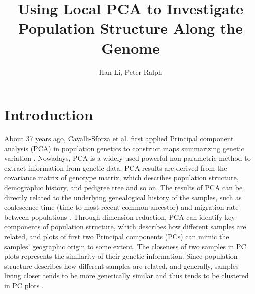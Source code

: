 \documentclass[11pt, oneside]{article}   	%
\title{Using Local PCA to Investigate Population Structure Along the Genome}
\author{Han Li, Peter Ralph}
\begin{document}
\maketitle
\doublespacing
\section{Introduction}

About 37 years ago, Cavalli-Sforza et al. first applied Principal component analysis (PCA) in population genetics to construct maps summarizing genetic variation \cite{key1}. Nowadays, PCA is a widely used powerful non-parametric method to extract information from genetic data. PCA results are derived from the covariance matrix of genotype matrix, which describes population structure, demographic history, and pedigree tree and so on. The results of PCA can be directly related to the underlying genealogical history of the samples, such as coalescence time (time to most recent common ancestor) and migration rate between populations \cite{key1,key2,key3}. Through dimension-reduction, PCA can identify key components of population structure, which describes how different samples are related, and plots of first two Principal components (PCs) can mimic the samples' geographic origin to some extent. The closeness of two samples in PC plots represents the similarity of their genetic information. Since population structure describes how different samples are related, and generally, samples living closer tends to be more genetically similar and thus tends to be clustered in PC plots \cite{key4,key6}.
 
\end{document}

